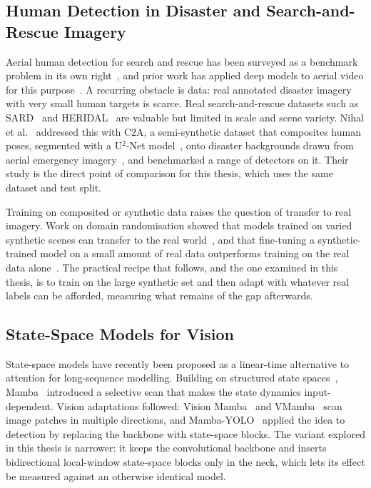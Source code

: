 \subsection{Human Detection in Disaster and Search-and-Rescue Imagery}
Aerial human detection for search and rescue has been surveyed as a benchmark
problem in its own right~\cite{sar_survey}, and prior work has applied deep models
to aerial video for this purpose~\cite{aerial_human_video}. A recurring obstacle is
data: real annotated disaster imagery with very small human targets is scarce. Real
search-and-rescue datasets such as SARD~\cite{sambolek2021sard} and
HERIDAL~\cite{bozic2019heridal} are valuable but limited in scale and scene variety.
Nihal et al.~\cite{nihal2024c2a} addressed this with C2A, a semi-synthetic dataset
that composites human poses, segmented with a U$^2$-Net model~\cite{qin2020u2net},
onto disaster backgrounds drawn from aerial emergency
imagery~\cite{kyrkou2020aider}, and benchmarked a range of detectors on it. Their
study is the direct point of comparison for this thesis, which uses the same dataset
and test split.

Training on composited or synthetic data raises the question of transfer to real
imagery. Work on domain randomisation showed that models trained on varied
synthetic scenes can transfer to the real world~\cite{tobin2017domainrand}, and
that fine-tuning a synthetic-trained model on a small amount of real data
outperforms training on the real data alone~\cite{tremblay2018synthetic}. The
practical recipe that follows, and the one examined in this thesis, is to train
on the large synthetic set and then adapt with whatever real labels can be
afforded, measuring what remains of the gap afterwards.

\subsection{State-Space Models for Vision}
State-space models have recently been proposed as a linear-time alternative to
attention for long-sequence modelling. Building on structured state
spaces~\cite{gu2022s4}, Mamba~\cite{gu2023mamba} introduced a selective scan that
makes the state dynamics input-dependent. Vision adaptations followed: Vision
Mamba~\cite{zhu2024visionmamba} and VMamba~\cite{liu2024vmamba} scan image patches in
multiple directions, and Mamba-YOLO~\cite{wang2025mambayolo} applied the idea to
detection by replacing the backbone with state-space blocks. The variant explored in
this thesis is narrower: it keeps
the convolutional backbone and inserts bidirectional local-window state-space
blocks only in the neck, which lets its effect be measured against an otherwise
identical model.

